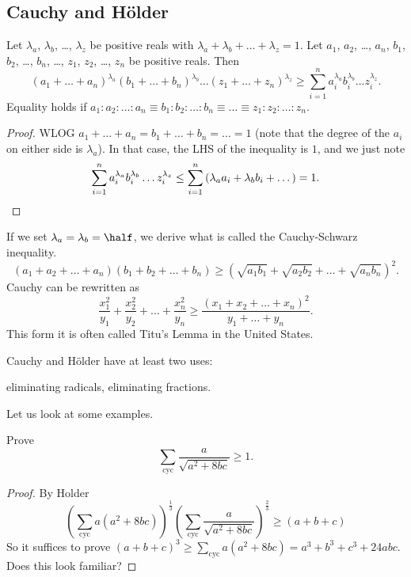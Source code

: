 \documentclass[11pt]{scrartcl}
\begin{document}
\subsection{Cauchy and H\"older}
\begin{theorem}
  Let $\lambda_a$, $\lambda_b$, \dots, $\lambda_z$ be positive reals with $\lambda_a + \lambda_b + \dots + \lambda_z = 1$.
  Let $a_1$, $a_2$, \dots, $a_n$, $b_1$, $b_2$, \dots, $b_n$, \dots, $z_1$, $z_2$, \dots, $z_n$ be positive reals.
  Then
  \[ \left( a_1+\dots+a_n \right)^{\lambda_a}
    \left( b_1+\dots+b_n \right)^{\lambda_b}
    \dots
    \left( z_1+\dots+z_n \right)^{\lambda_z}
    \ge \sum_{i=1}^n a_i^{\lambda_a} b_i^{\lambda_b} \dots z_i^{\lambda_z}. \]
  Equality holds if $a_1 : a_2 : \dots : a_n \equiv b_1 : b_2 : \dots : b_n \equiv \dots \equiv z_1 : z_2 : \dots : z_n$.
\end{theorem}
\begin{proof}
  WLOG $a_1+\dots+a_n = b_1+\dots+b_n = \dots = 1$
  (note that the degree of the $a_i$ on either side is $\lambda_a$).
  In that case, the LHS of the inequality is $1$, and we just note
  \[ \sum_{i=1}^n a_i^{\lambda_a} b_i^{\lambda_b} \dots z_i^{\lambda_z}
    \le \sum_{i=1}^n \left( \lambda_a a_i + \lambda_b b_i + \dots \right)
    = 1. \qedhere \]
\end{proof}
If we set $\lambda_a = \lambda_b = \half$, we derive what is called the Cauchy-Schwarz inequality.
\[ \left( a_1+a_2+\dots+a_n \right)\left( b_1+b_2+\dots+b_n \right)
  \ge \left( \sqrt{a_1 b_1} + \sqrt{a_2 b_2} + \dots + \sqrt{a_n b_n} \right)^2. \]
Cauchy can be rewritten as
\[ \frac{x_1^2}{y_1} + \frac{x_2^2}{y_2} + \dots + \frac{x_n^2}{y_n}
  \ge \frac{\left( x_1+x_2+\dots+x_n \right)^2}{y_1+\dots+y_n}. \]
This form it is often called Titu's Lemma in the United States.

Cauchy and H\"older have at least two uses:
\begin{enumerate}
  \ii eliminating radicals,
  \ii eliminating fractions.
\end{enumerate}

Let us look at some examples.
\begin{example}
  [IMO 2001] Prove \[ \sum_{\text{cyc}} \frac{a}{\sqrt{a^2+8bc}} \ge 1. \]
\end{example}
\begin{proof}
  By Holder
  \[
    \left( \sum_{\text{cyc}} a(a^2+8bc) \right)^{\frac13}
    \left( \sum_{\text{cyc}} \frac{a}{\sqrt{a^2+8bc}} \right)^{\frac 23}
    \ge \left( a+b+c \right)
  \]
  So it suffices to prove $(a+b+c)^3 \ge \sum_{\text{cyc}} a(a^2+8bc) = a^3+b^3+c^3+24abc$. Does this look familiar?
\end{proof}
\end{document}
